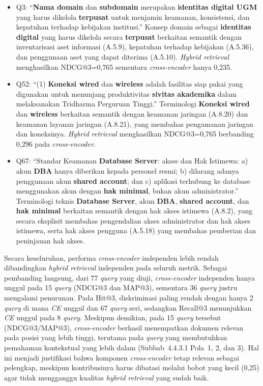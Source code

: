 \begin{itemize}
	\item Q3: ``\textbf{Nama domain} dan \textbf{subdomain} merupakan \textbf{identitas digital UGM} yang harus dikelola \textbf{terpusat} untuk menjamin keamanan, konsistensi, dan kepatuhan terhadap kebijakan institusi.'' Konsep domain sebagai \textbf{identitas digital} yang harus dikelola secara \textbf{terpusat} berkaitan semantik dengan inventarisasi aset informasi (A.5.9), kepatuhan terhadap kebijakan (A.5.36), dan penggunaan aset yang dapat diterima (A.5.10). \textit{Hybrid retrieval} menghasilkan NDCG@3=0{,}765 sementara \textit{cross-encoder} hanya 0{,}235.
	\item Q52: ``(1) \textbf{Koneksi wired} dan \textbf{wireless} adalah fasilitas siap pakai yang digunakan untuk menunjang produktivitas \textbf{sivitas akademika} dalam melaksanakan Tridharma Perguruan Tinggi.'' Terminologi \textbf{Koneksi wired} dan \textbf{wireless} berkaitan semantik dengan keamanan jaringan (A.8.20) dan keamanan layanan jaringan (A.8.21), yang membahas pengamanan jaringan dan koneksinya. \textit{Hybrid retrieval} menghasilkan NDCG@3=0{,}765 berbanding 0{,}296 pada \textit{cross-encoder}.
	\item Q67: ``Standar Keamanan \textbf{Database Server}: akses dan Hak Istimewa: a) akun \textbf{DBA} hanya diberikan kepada personel resmi; b) dilarang adanya penggunaan akun \textbf{shared account}; dan c) aplikasi terhubung ke database menggunakan akun dengan \textbf{hak minimal}, bukan akun administrator.'' Terminologi teknis \textbf{Database Server}, akun \textbf{DBA}, \textbf{shared account}, dan \textbf{hak minimal} berkaitan semantik dengan hak akses istimewa (A.8.2), yang secara eksplisit membahas pengendalian akses administrator dan hak akses istimewa, serta hak akses pengguna (A.5.18) yang membahas pemberian dan peninjauan hak akses.
\end{itemize}

Secara keseluruhan, performa \textit{cross-encoder} independen lebih rendah dibandingkan \textit{hybrid retrieval} independen pada seluruh metrik. Sebagai pembanding langsung, dari 77 \textit{query} yang diuji, \textit{cross-encoder} independen hanya unggul pada 15 \textit{query} (NDCG@3 dan MAP@3), sementara 36 \textit{query} justru mengalami penurunan. Pada Hit@3, diskriminasi paling rendah dengan hanya 2 \textit{query} di mana \textit{CE} unggul dan 67 \textit{query} seri, sedangkan Recall@3 menunjukkan \textit{CE} unggul pada 8 \textit{query}. Meskipun demikian, pada 15 \textit{query} tersebut (NDCG@3/MAP@3), \textit{cross-encoder} berhasil menempatkan dokumen relevan pada posisi yang lebih tinggi, terutama pada \textit{query} yang membutuhkan pemahaman kontekstual yang lebih dalam (Subbab~4.4.3.1 Pola~1, 2, dan 3). Hal ini menjadi justifikasi bahwa komponen \textit{cross-encoder} tetap relevan sebagai pelengkap, meskipun kontribusinya harus dibatasi melalui bobot yang kecil (0{,}25) agar tidak mengganggu kualitas \textit{hybrid retrieval} yang sudah baik.


